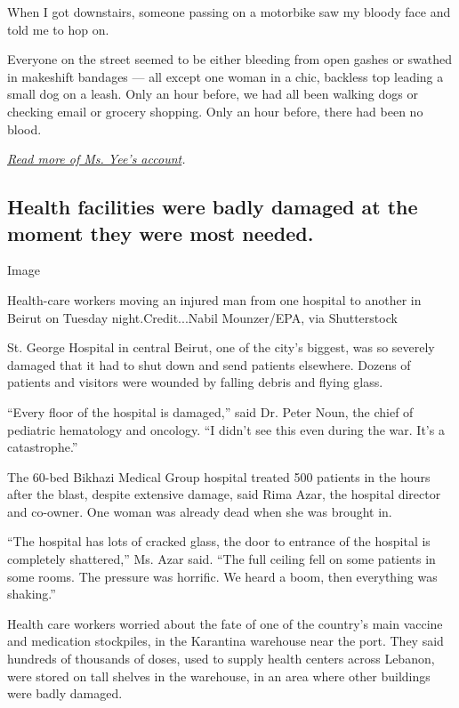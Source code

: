 When I got downstairs, someone passing on a motorbike saw my bloody face
and told me to hop on.

Everyone on the street seemed to be either bleeding from open gashes or
swathed in makeshift bandages --- all except one woman in a chic,
backless top leading a small dog on a leash. Only an hour before, we had
all been walking dogs or checking email or grocery shopping. Only an
hour before, there had been no blood.

\href{https://www.nytimes.com/2020/08/04/world/middleeast/beirut-explosion-first-person.html}{\emph{Read
more of Ms. Yee's account}}\emph{.}

\hypertarget{health-facilities-were-badly-damaged-at-the-moment-they-were-most-needed}{%
\subsection{Health facilities were badly damaged at the moment they were
most
needed.}\label{health-facilities-were-badly-damaged-at-the-moment-they-were-most-needed}}

Image

Health-care workers moving an injured man from one hospital to another
in Beirut on Tuesday night.Credit...Nabil Mounzer/EPA, via Shutterstock

St. George Hospital in central Beirut, one of the city's biggest, was so
severely damaged that it had to shut down and send patients elsewhere.
Dozens of patients and visitors were wounded by falling debris and
flying glass.

``Every floor of the hospital is damaged,'' said Dr. Peter Noun, the
chief of pediatric hematology and oncology. ``I didn't see this even
during the war. It's a catastrophe.''

The 60-bed Bikhazi Medical Group hospital treated 500 patients in the
hours after the blast, despite extensive damage, said Rima Azar, the
hospital director and co-owner. One woman was already dead when she was
brought in.

``The hospital has lots of cracked glass, the door to entrance of the
hospital is completely shattered,'' Ms. Azar said. ``The full ceiling
fell on some patients in some rooms. The pressure was horrific. We heard
a boom, then everything was shaking.''

Health care workers worried about the fate of one of the country's main
vaccine and medication stockpiles, in the Karantina warehouse near the
port. They said hundreds of thousands of doses, used to supply health
centers across Lebanon, were stored on tall shelves in the warehouse, in
an area where other buildings were badly damaged.

